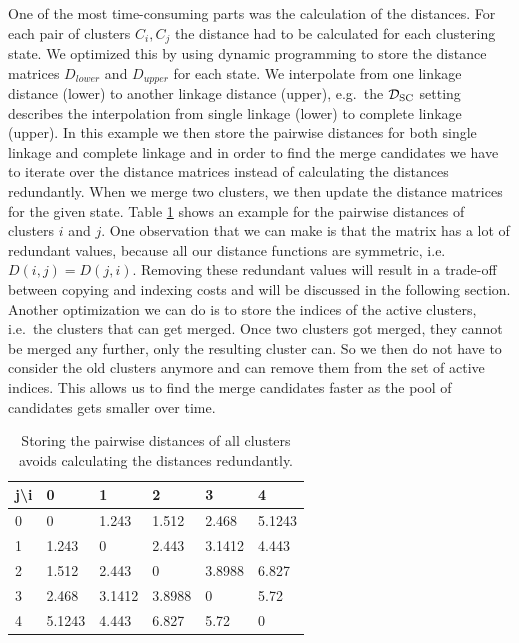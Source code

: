 One of the most time-consuming parts was the calculation of the distances. For each pair of clusters $C_i, C_j$ the distance had to be calculated for each clustering state. We optimized this by using dynamic programming to store the distance matrices $D_{lower}$ and $D_{upper}$ for each state. We interpolate from one linkage distance (lower) to another linkage distance (upper), e.g.\ the $\mathcal{D}_\text{SC}$ setting describes the interpolation from single linkage (lower) to complete linkage (upper). In this example we then store the pairwise distances for both single linkage and complete linkage and in order to find the merge candidates we have to iterate over the distance matrices instead of calculating the distances redundantly. When we merge two clusters, we then update the distance matrices for the given state. Table \ref{dp:distances} shows an example for the pairwise distances of clusters $i$ and $j$. One observation that we can make is that the matrix has a lot of redundant values, because all our distance functions are symmetric, i.e.\ $D(i,j) = D(j,i)$. Removing these redundant values will result in a trade-off between copying and indexing costs and will be discussed in the following section. Another optimization we can do is to store the indices of the active clusters, i.e.\ the clusters that can get merged. Once two clusters got merged, they cannot be merged any further, only the resulting cluster can. So we then do not have to consider the old clusters anymore and can remove them from the set of active indices. This allows us to find the merge candidates faster as the pool of candidates gets smaller over time.

\begin{table}[H]
    \centering
    \begin{tabular}{|l | l l l l l|}
    \hline
    j\textbackslash i & 0 & 1 & 2 & 3 & 4\\ \hline
    0 & 0 & 1.243 & 1.512 & 2.468 & 5.1243\\
    1 & 1.243 & 0 & 2.443 & 3.1412 & 4.443\\
    2 & 1.512 & 2.443 & 0 & 3.8988 & 6.827\\
    3 & 2.468 & 3.1412 & 3.8988 & 0 & 5.72\\
    4 & 5.1243 & 4.443 & 6.827 & 5.72 & 0\\ \hline
    \end{tabular}
    \caption{Storing the pairwise distances of all clusters avoids calculating the distances redundantly.}
    \label{dp:distances}
\end{table}


